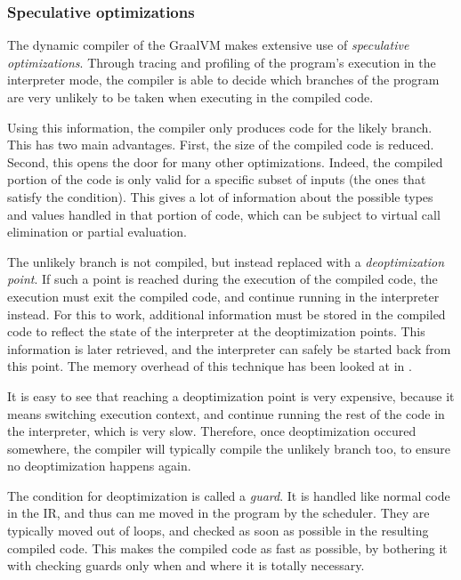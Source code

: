 \documentclass[twoside,11pt,a4paper]{article}
\begin{document}
\subsubsection{Speculative optimizations}

The dynamic compiler of the GraalVM makes extensive use of \textit{speculative optimizations}. Through tracing and profiling of the program's execution in the interpreter mode, the compiler is able to decide which branches of the program are very unlikely to be taken when executing in the compiled code.

Using this information, the compiler only produces code for the likely branch. This has two main advantages. First, the size of the compiled code is reduced. Second, this opens the door for many other optimizations. Indeed, the compiled portion of the code is only valid for a specific subset of inputs (the ones that satisfy the condition). This gives a lot of information about the possible types and values handled in that portion of code, which can be subject to virtual call elimination or partial evaluation.

The unlikely branch is not compiled, but instead replaced with a \textit{deoptimization point}. If such a point is reached during the execution of the compiled code, the execution must exit the compiled code, and continue running in the interpreter instead. For this to work, additional information must be stored in the compiled code to reflect the state of the interpreter at the deoptimization points. This information is later retrieved, and the interpreter can safely be started back from this point. The memory overhead of this technique has been looked at in \cite{graaldatacompression}.

It is easy to see that reaching a deoptimization point is very expensive, because it means switching execution context, and continue running the rest of the code in the interpreter, which is very slow. Therefore, once deoptimization occured somewhere, the compiler will typically compile the unlikely branch too, to ensure no deoptimization happens again.

The condition for deoptimization is called a \textit{guard}. It is handled like normal code in the IR, and thus can me moved in the program by the scheduler. They are typically moved out of loops, and checked as soon as possible in the resulting compiled code. This makes the compiled code as fast as possible, by bothering it with checking guards only when and where it is totally necessary.
\end{document}
